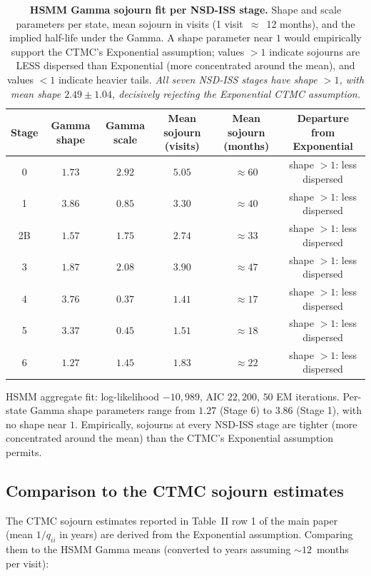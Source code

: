 \documentclass[11pt]{article}
\begin{document}
\begin{table}[h!]
\centering
\caption{\textbf{HSMM Gamma sojourn fit per NSD-ISS stage.} Shape and scale parameters per state, mean sojourn in visits (1 visit~$\approx$~12 months), and the implied half-life under the Gamma. A shape parameter near $1$ would empirically support the CTMC's Exponential assumption; values $>1$ indicate sojourns are LESS dispersed than Exponential (more concentrated around the mean), and values $<1$ indicate heavier tails. \emph{All seven NSD-ISS stages have shape $> 1$, with mean shape $2.49 \pm 1.04$, decisively rejecting the Exponential CTMC assumption.}}
\label{tab:s_wsp310_hsmm}
\begin{tabular}{cccccc}
\toprule
\textbf{Stage} & \textbf{Gamma shape} & \textbf{Gamma scale} & \textbf{Mean sojourn (visits)} & \textbf{Mean sojourn (months)} & \textbf{Departure from Exponential} \\
\midrule
0  & $1.73$ & $2.92$ & $5.05$ & $\approx 60$ & shape $> 1$: less dispersed \\
1  & $3.86$ & $0.85$ & $3.30$ & $\approx 40$ & shape $> 1$: less dispersed \\
2B & $1.57$ & $1.75$ & $2.74$ & $\approx 33$ & shape $> 1$: less dispersed \\
3  & $1.87$ & $2.08$ & $3.90$ & $\approx 47$ & shape $> 1$: less dispersed \\
4  & $3.76$ & $0.37$ & $1.41$ & $\approx 17$ & shape $> 1$: less dispersed \\
5  & $3.37$ & $0.45$ & $1.51$ & $\approx 18$ & shape $> 1$: less dispersed \\
6  & $1.27$ & $1.45$ & $1.83$ & $\approx 22$ & shape $> 1$: less dispersed \\
\bottomrule
\end{tabular}
\end{table}

\noindent HSMM aggregate fit: log-likelihood $-10{,}989$, AIC $22{,}200$, $50$ EM iterations. Per-state Gamma shape parameters range from $1.27$ (Stage 6) to $3.86$ (Stage 1), with no shape near $1$. Empirically, sojourns at every NSD-ISS stage are tighter (more concentrated around the mean) than the CTMC's Exponential assumption permits.

\subsection*{Comparison to the CTMC sojourn estimates}

The CTMC sojourn estimates reported in Table~II row 1 of the main paper (mean $1/q_{ii}$ in years) are derived from the Exponential assumption. Comparing them to the HSMM Gamma means (converted to years assuming $\sim 12$~months per visit):
\end{document}
